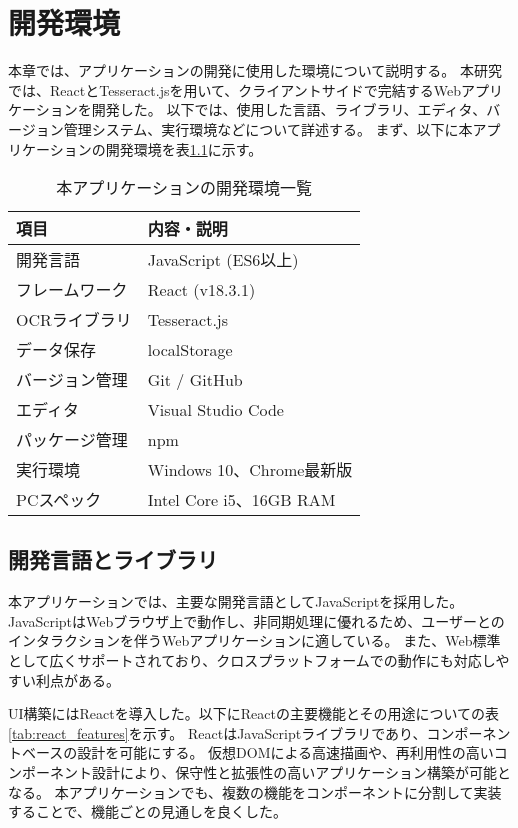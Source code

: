 \documentclass[main]{subfiles}
\begin{document}
\chapter{開発環境}
\label{cha:environment}
本章では、アプリケーションの開発に使用した環境について説明する。
本研究では、ReactとTesseract.jsを用いて、クライアントサイドで完結するWebアプリケーションを開発した。
以下では、使用した言語、ライブラリ、エディタ、バージョン管理システム、実行環境などについて詳述する。
まず、以下に本アプリケーションの開発環境を表\ref{tab:dev_environment}に示す。

\begin{table}[htbp]
\centering
\caption{本アプリケーションの開発環境一覧}
\label{tab:dev_environment}
\begin{tabular}{ll}
\hline
項目 & 内容・説明 \\
\hline
開発言語 & JavaScript (ES6以上) \\
フレームワーク & React (v18.3.1) \\
OCRライブラリ & Tesseract.js \\
データ保存 & localStorage \\
バージョン管理 & Git / GitHub \\
エディタ & Visual Studio Code \\
パッケージ管理 & npm \\
実行環境 & Windows 10、Chrome最新版 \\
PCスペック & Intel Core i5、16GB RAM \\
\hline
\end{tabular}
\end{table}

\section{開発言語とライブラリ}

本アプリケーションでは、主要な開発言語としてJavaScriptを採用した。  
JavaScriptはWebブラウザ上で動作し、非同期処理に優れるため、ユーザーとのインタラクションを伴うWebアプリケーションに適している。  
また、Web標準として広くサポートされており、クロスプラットフォームでの動作にも対応しやすい利点がある。

UI構築にはReactを導入した。以下にReactの主要機能とその用途についての表\ref{tab:react_features}を示す。
ReactはJavaScriptライブラリであり、コンポーネントベースの設計を可能にする。  
仮想DOMによる高速描画や、再利用性の高いコンポーネント設計により、保守性と拡張性の高いアプリケーション構築が可能となる。  
本アプリケーションでも、複数の機能をコンポーネントに分割して実装することで、機能ごとの見通しを良くした。
\end{document}
